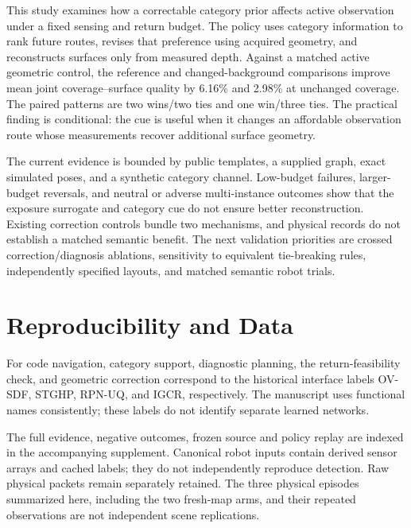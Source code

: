 \documentclass[11pt,a4paper]{article}
\providecommand{\hypertarget}[2]{#2}
\begin{document}
This study examines how a correctable category prior affects active observation under a fixed sensing and return budget. The policy uses category information to rank future routes, revises that preference using acquired geometry, and reconstructs surfaces only from measured depth. Against a matched active geometric control, the reference and changed-background comparisons improve mean joint coverage--surface quality by 6.16\% and 2.98\% at unchanged coverage. The paired patterns are two wins/two ties and one win/three ties. The practical finding is conditional: the cue is useful when it changes an affordable observation route whose measurements recover additional surface geometry.

The current evidence is bounded by public templates, a supplied graph, exact simulated poses, and a synthetic category channel. Low-budget failures, larger-budget reversals, and neutral or adverse multi-instance outcomes show that the exposure surrogate and category cue do not ensure better reconstruction. Existing correction controls bundle two mechanisms, and physical records do not establish a matched semantic benefit. The next validation priorities are crossed correction/diagnosis ablations, sensitivity to equivalent tie-breaking rules, independently specified layouts, and matched semantic robot trials.

\hypertarget{reproducibility-and-data}{%
\section{Reproducibility and Data}\label{reproducibility-and-data}}

For code navigation, category support, diagnostic planning, the return-feasibility check, and geometric correction correspond to the historical interface labels OV-SDF, STGHP, RPN-UQ, and IGCR, respectively. The manuscript uses functional names consistently; these labels do not identify separate learned networks.

The full evidence, negative outcomes, frozen source and policy replay are indexed in the accompanying supplement. Canonical robot inputs contain derived sensor arrays and cached labels; they do not independently reproduce detection. Raw physical packets remain separately retained. The three physical episodes summarized here, including the two fresh-map arms, and their repeated observations are not independent scene replications.
\end{document}
